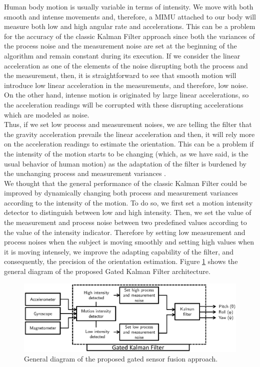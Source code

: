 \documentclass{IOS-Book-Article}
\begin{document}
\indent Human body motion is usually variable in terms of intensity. We move with both smooth and intense movements and, therefore, a MIMU attached to our body will measure both low and high angular rate and accelerations. This can be a problem for the accuracy of the classic Kalman Filter approach since both the variances of the process noise and the measurement noise are set at the beginning of the algorithm and remain constant during its execution. If we consider the linear acceleration as one of the elements of the noise disrupting both the process and the measurement, then, it is straightforward to see that smooth motion will introduce low linear acceleration in the measurements, and therefore, low noise. On the other hand, intense motion is originated by large linear accelerations, so the acceleration readings will be corrupted with these disrupting accelerations which are modeled as noise. \\
\indent Thus, if we set low process and measurement noises, we are telling the filter that the gravity acceleration prevails the linear acceleration and then, it will rely more on the acceleration readings to estimate the orientation. This can be a problem if the intensity of the motion starts to be changing (which, as we have said, is the usual behavior of human motion) as the adaptation of the filter is burdened by the unchanging process and measurement variances \cite{olivares_thesis}. \\
\indent We thought that the general performance of the classic Kalman Filter could be improved by dynamically changing both process and measurement variances according to the intensity of the motion. To do so, we first set a motion intensity detector to distinguish between low and high intensity. Then, we set the value of the measurement and process noise between two predefined values according to the value of the intensity indicator. Therefore by setting low measurement and process noises when the subject is moving smoothly and setting high values when it is moving intensely, we improve the adapting capability of the filter, and consequently, the precision of the orientation estimation. Figure \ref{fig:GKFDiagram} shows the general diagram of the proposed Gated Kalman Filter architecture.

\begin{figure}[t]
\centering
\includegraphics[width=1\textwidth]{figures/GKFDiagram.eps}
\caption{General diagram of the proposed gated sensor fusion approach.}
\label{fig:GKFDiagram}
\end{figure}
\end{document}
